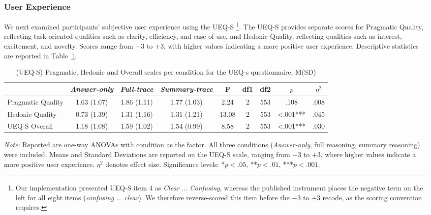 \documentclass[manuscript,review,anonymous]{acmart}
\begin{document}
\subsubsection{User Experience}
We next examined participants' subjective user experience using the UEQ-S \cite{alberola2018creation}\footnote{Our implementation presented UEQ-S item 4 as \textit{Clear} $\ldots$ \textit{Confusing}, whereas the published instrument places the negative term on the left for all eight items (\textit{confusing} $\ldots$ \textit{clear}). We therefore reverse-scored this item before the $-3$ to $+3$ recode, as the scoring convention requires.}. The UEQ-S provides separate scores for Pragmatic Quality, reflecting task-oriented qualities such as clarity, efficiency, and ease of use, and Hedonic Quality, reflecting qualities such as interest, excitement, and novelty. Scores range from $-3$ to $+3$, with higher values indicating a more positive user experience. Descriptive statistics are reported in Table~\ref{tab:ueqs}.

\begin{table}[!htp]
\centering
\caption{(UEQ-S) Pragmatic, Hedonic and Overall scales per condition for the UEQ-s questionnaire, M(SD)}
\begin{tabular}{lcccccccc}
\hline
                  & \textit{Answer-only}    & \textit{Full-trace}   & \textit{Summary-trace}   & F & df1 & df2 & $p$     & $\eta^2$ \\ \hline
Pragmatic Quality & 1.63 (1.07) & 1.86 (1.11) & 1.77 (1.03) & 2.24 & 2 & 553 & .108 & .008 \\
Hedonic Quality   & 0.73 (1.39) & 1.31 (1.16) & 1.31 (1.21) & 13.08 & 2 & 553 & <.001*** & .045 \\
UEQ-S Overall     & 1.18 (1.08) & 1.59 (1.02) & 1.54 (0.99) & 8.58 & 2 & 553 & <.001*** & .030 \\  
\hline
\end{tabular}

\raggedright \small \textit{Note}: Reported are one-way ANOVAs with condition as the factor. All three conditions (\textit{Answer-only}, full reasoning, summary reasoning) were included. Means and Standard Deviations are reported on the UEQ-S scale, ranging from $-3$ to $+3$, where higher values indicate a more positive user experience. $\eta^2$ denotes effect size.  Significance levels: *$p < .05$, **$p < .01$, ***$p < .001$.
\label{tab:ueqs}
\end{table}
\end{document}
